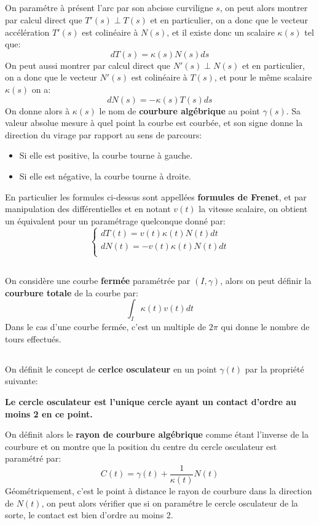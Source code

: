 \subsection*{}
On paramétre à présent l'arc par son abcisse curviligne \(s\), on peut alors montrer par calcul direct que \(T'(s) \perp T(s) \) et en particulier, on a donc que le vecteur accélération \(T'(s)\) est colinéaire à \(N(s)\), et il existe donc un scalaire \(\kappa(s)\) tel que:
\[
   dT(s) = \kappa(s)N(s)ds
\]
On peut aussi montrer par calcul direct que \(N'(s) \perp N(s) \) et en particulier, on a donc que le vecteur \(N'(s)\) est colinéaire à \(T(s)\), et pour le même scalaire \(\kappa(s)\) on a:
\[
   dN(s) = -\kappa(s)T(s)ds
\]
On donne alors à \(\kappa(s)\) le nom de \textbf{courbure algébrique} au point \(\gamma(s)\). Sa valeur absolue mesure à quel point la courbe est courbée, et son signe donne la direction du virage par rapport au sens de parcours:
\begin{itemize}
   \item Si elle est positive, la courbe tourne à gauche.
   \item Si elle est négative, la courbe tourne à droite.
\end{itemize}
En particulier les formules ci-dessus sont appellées \textbf{formules de Frenet}, et par manipulation des différentielles et en notant \(v(t)\) la vitesse scalaire, on obtient un équivalent pour un paramétrage quelconque donné par:
\[
   \begin{cases}
      dT(t) = v(t)\kappa(t)N(t)dt\\
      dN(t) = -v(t)\kappa(t)N(t)dt\\
   \end{cases}   
\]
\subsection*{}
On considère une courbe \textbf{fermée} paramétrée par \((I, \gamma)\), alors on peut définir la \textbf{courbure totale} de la courbe par:
\[
   \int_I\kappa(t)v(t)dt   
\]
Dans le cas d'une courbe fermée, c'est un multiple de \(2\pi\) qui donne le nombre de tours effectués.
\pagebreak

\subsection*{}
On définit le concept de \textbf{cerlce osculateur} en un point \(\gamma(t)\) par la propriété suivante:
\begin{center}
   \textbf{Le cercle osculateur est l'unique cercle ayant un contact d'ordre au moins 2 en ce point.}
\end{center}
On définit alors le \textbf{rayon de courbure algébrique} comme étant l'inverse de la courbure et on montre que la position du centre du cercle osculateur est paramétré par:
\[
   C(t) = \gamma(t) + \frac{1}{\kappa(t)}N(t) 
\] 
Géométriquement, c'est le point à distance le rayon de courbure dans la direction de \(N(t)\), on peut alors vérifier que si on paramétre le cercle osculateur de la sorte, le contact est bien d'ordre au moins 2.\< 

